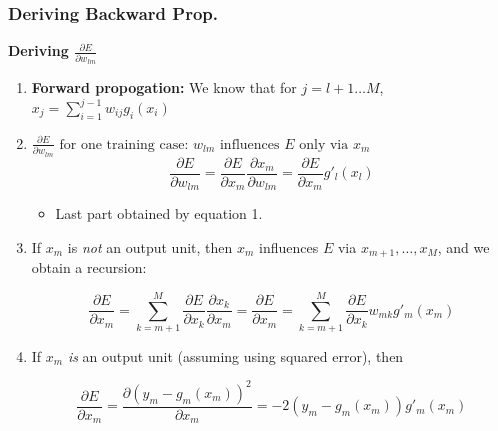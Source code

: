 \subsubsection{Deriving Backward Prop.}
\begin{derivation}
    \textbf{Deriving $\frac{\partial E}{\partial w_{lm}}$}

    \begin{enumerate}
        \item \textbf{Forward propogation:} We know that for $j = l + 1 \dots M$, $x_j = \sum_{i=1}^{j-1} w_{ij} g_i(x_i)$ \quad {}

        \item $\frac{\partial E}{\partial w_{lm}} \text{ for one training case: } w_{lm} \text{ influences $E$ only via $x_m$}$
        \begin{equation*}
            \frac{\partial E}{\partial w_{lm}} = \frac{\partial E}{\partial x_m} \frac{\partial x_m}{\partial w_{lm}} = \frac{\partial E}{\partial x_m} g'_l(x_l)   
        \end{equation*}
        \begin{itemize}
            \item Last part obtained by equation 1.
        \end{itemize}

    
        \item If $x_m$ is \textit{not} an output unit, then $x_m$ influences $E$ via $x_{m+1}, \dots, x_M$, and we obtain a recursion:
    
        \[
        \frac{\partial E}{\partial x_m} = \sum_{k=m+1}^{M} \frac{\partial E}{\partial x_k} \frac{\partial x_k}{\partial x_m} = \frac{\partial E}{\partial x_m} = \sum_{k=m+1}^{M} \frac{\partial E}{\partial x_k} w_{mk} g'_m(x_m)
        \]
    
        \item  If $x_m$ \textit{is} an output unit (assuming using squared error), then
    
        \[
        \frac{\partial E}{\partial x_m} = \frac{\partial (y_m - g_m(x_m))^2}{\partial x_m} = -2(y_m - g_m(x_m)) g'_m(x_m)
        \]
    \end{enumerate}
\end{derivation}

